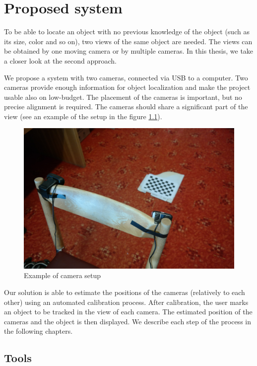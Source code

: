 \chapter{Proposed system}

To be able to locate an object with no previous knowledge of the object (such
as its size, color and so on), two views of the same object are needed. The
views can be obtained by one moving camera or by multiple cameras. In this
thesis, we take a closer look at the second approach.

We propose a system with two cameras, connected via USB to a computer.
Two cameras provide enough information for object localization and make the
project usable also on low-budget. The placement of the cameras is important,
but no precise alignment is required. The cameras should share a significant part
of the view (see an example of the setup in the figure \ref{fig:camera-setup}).

\begin{figure}
	\includegraphics[width=\linewidth]{img/camera-positions.jpg}
	\caption{Example of camera setup}
	\label{fig:camera-setup}
\end{figure}

Our solution is able to estimate the positions of the cameras (relatively to
each other) using an automated calibration process. After calibration, the user
marks an object to be tracked in the view of each camera. The estimated
position of the cameras and the object is then displayed. We describe each step
of the process in the following chapters.

\section{Tools}

